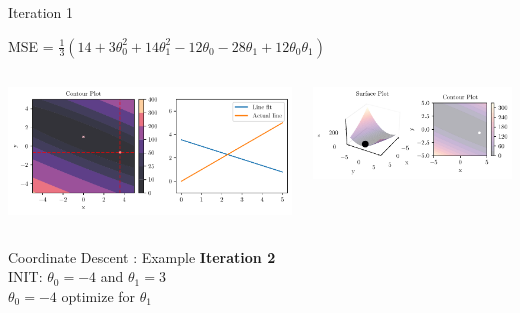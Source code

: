 \documentclass{beamer}
\begin{document}
\begin{frame}{Iteration 1}

MSE = $\frac{1}{3}(14+3\theta_{0}^{2}+14\theta_{1}^{2}-12\theta_{0}-28\theta_{1}+12\theta_{0}\theta_{1})$\\

\begin{columns}
\begin{column}{0.6\textwidth}
\begin{adjustbox}{max totalsize={\textwidth},center}
\includegraphics[width=\textwidth]{../../maths/assets/mathematical-ml/figures/gradient-descent-1.pdf}
\end{adjustbox}

\end{column}
\begin{column}{0.5\textwidth}
\begin{adjustbox}{max totalsize={\textwidth},center}
\includegraphics[width=\textwidth]{../../maths/assets/mathematical-ml/figures/contour-linreg-1.pdf}
\end{adjustbox}
\end{column}
\end{columns}


\end{frame}

\begin{frame}{Coordinate Descent : Example}
\textbf{Iteration 2}\\
\vspace{0.5cm}
INIT: $\theta_{0} = -4$ and  $\theta_{1}  = 3$\\

\vspace{0.5cm}
$\theta_0 = -4$ optimize for $\theta_{1}$\\ 


\end{frame}
\end{document}
